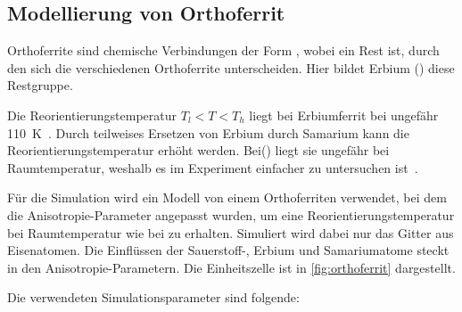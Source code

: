 \documentclass[main.tex]{subfiles}
\begin{document}
\subsection{Modellierung von Orthoferrit}

Orthoferrite sind chemische Verbindungen der Form , wobei  ein Rest ist, durch den sich die verschiedenen Orthoferrite unterscheiden. Hier bildet Erbium () diese Restgruppe. 



Die Reorientierungstemperatur \(T_l < T < T_h\) liegt bei Erbiumferrit bei ungefähr \SI{110}{\kelvin}~\cite{Deng2015}. 
Durch teilweises Ersetzen von Erbium durch Samarium kann die Reorientierungstemperatur erhöht werden. Bei() liegt sie ungefähr bei Raumtemperatur, weshalb es im Experiment einfacher zu untersuchen ist~\cite{Fitzky2021}.


Für die Simulation wird ein Modell von einem Orthoferriten verwendet, bei dem
die Anisotropie-Parameter angepasst wurden, um eine Reorientierungstemperatur
bei Raumtemperatur wie bei  zu erhalten.
Simuliert wird dabei nur das Gitter aus Eisenatomen. Die Einflüssen der
Sauerstoff-, Erbium und Samariumatome steckt in den Anisotropie-Parametern. Die
Einheitszelle ist in \cref{fig:orthoferrit} dargestellt.

Die verwendeten Simulationsparameter sind folgende:
\end{document}

